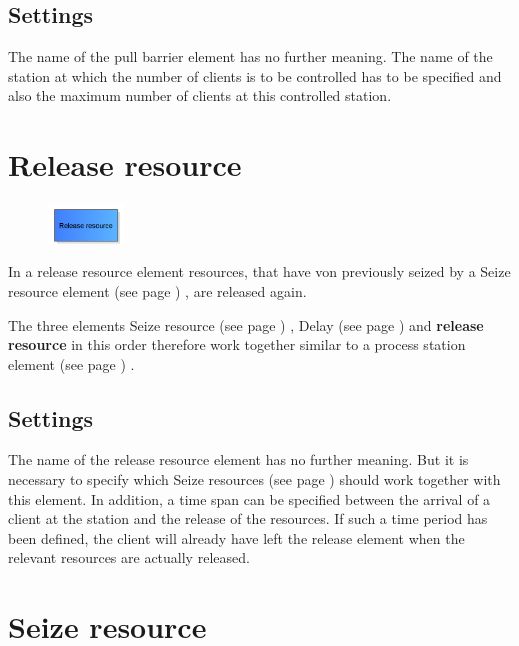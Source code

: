\subsection*{Settings}

The name of the pull barrier element has no further meaning. The name of
the station at which the number of clients is to be controlled has
to be specified and also the maximum number of clients at this controlled
station.


\section{Release resource}
\label{ref:ModelElementRelease}

\begin{figure}
\vspace{-22pt}
\includegraphics[width=2cm]{imageModelElementRelease.png}
\vspace{-22pt}
\end{figure}

In a release resource element resources, that have von previously seized by a
Seize resource element (see page \pageref{ref:ModelElementSeize}) , are released again.

The three elements Seize resource (see page \pageref{ref:ModelElementSeize}) , Delay (see page \pageref{ref:ModelElementDelay}) and
\textbf{release resource} in this order therefore work together similar to a
process station element (see page \pageref{ref:ModelElementProcess}) .

\subsection*{Settings}

The name of the release resource element has no further meaning. But it is necessary to specify
which Seize resources (see page \pageref{ref:ModelElementSeize}) should work together with this element.
In addition, a time span can be specified between the arrival of a client at the station and
the release of the resources. If such a time period has been defined, the client will already have
left the release element when the relevant resources are actually released.


\section{Seize resource}
\label{ref:ModelElementSeize}

